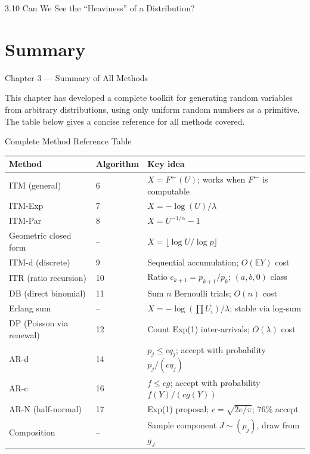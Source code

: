 \documentclass[aspectratio=169,10pt]{beamer}
\newcommand{\EE}{\mathbb{E}}
\newcommand{\FInv}{F^{\leftarrow}}
\begin{document}
\begin{frame}[allowframebreaks]{3.10 Can We See the ``Heaviness'' of a Distribution?}
\end{frame}

\section{Summary}

\begin{frame}[allowframebreaks]{Chapter 3 --- Summary of All Methods}

  This chapter has developed a complete toolkit for generating random variables
  from arbitrary distributions, using only uniform random numbers as a primitive.
  The table below gives a concise reference for all methods covered.

  \begin{block}{Complete Method Reference Table}
    \begin{tabular}{@{}llp{4.8cm}@{}}
      \toprule
      Method & Algorithm & Key idea \\
      \midrule
      ITM (general) & 6 & $X = F^{\leftarrow}(U)$; works when $\FInv$ is computable \\
      ITM-Exp & 7 & $X = -\log(U)/\lambda$ \\
      ITM-Par & 8 & $X = U^{-1/\alpha} - 1$ \\
      Geometric closed form & -- & $X = \lfloor\log U/\log p\rfloor$ \\
      ITM-d (discrete) & 9 & Sequential accumulation; $O(\EE Y)$ cost \\
      ITR (ratio recursion) & 10 & Ratio $c_{k+1} = p_{k+1}/p_k$; $(a,b,0)$ class \\
      DB (direct binomial) & 11 & Sum $n$ Bernoulli trials; $O(n)$ cost \\
      Erlang sum & -- & $X = -\log(\prod U_i)/\lambda$; stable via log-sum \\
      DP (Poisson via renewal) & 12 & Count Exp(1) inter-arrivals; $O(\lambda)$ cost \\
      AR-d & 14 & $p_j \le cq_j$; accept with probability $p_j/(cq_j)$ \\
      AR-c & 16 & $f \le cg$; accept with probability $f(Y)/(cg(Y))$ \\
      AR-N (half-normal) & 17 & Exp(1) proposal; $c = \sqrt{2e/\pi}$; $76\%$ accept \\
      Composition & -- & Sample component $J \sim (p_j)$, draw from $g_J$ \\

\end{tabular}
\end{block}
\end{frame}
\end{document}
